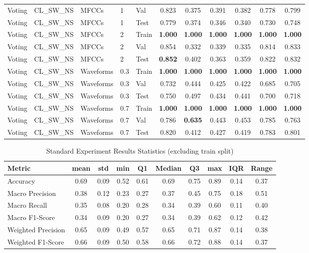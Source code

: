 \begin{landscape}
\begin{longtable}{|l|l|l|l|l|c|c|c|c|c|c|}
Voting & CL\_SW\_NS & MFCCs & 1 & Val & 0.823 & 0.375 & 0.391 & 0.382 & 0.778 & 0.799 \\
Voting & CL\_SW\_NS & MFCCs & 1 & Test & 0.779 & 0.374 & 0.346 & 0.340 & 0.730 & 0.748 \\
Voting & CL\_SW\_NS & MFCCs & 2 & Train & \textbf{1.000} & \textbf{1.000} & \textbf{1.000} & \textbf{1.000} & \textbf{1.000} & \textbf{1.000} \\
Voting & CL\_SW\_NS & MFCCs & 2 & Val & 0.854 & 0.332 & 0.339 & 0.335 & 0.814 & 0.833 \\
Voting & CL\_SW\_NS & MFCCs & 2 & Test & \textbf{0.852} & 0.402 & 0.363 & 0.359 & 0.822 & 0.832 \\
Voting & CL\_SW\_NS & Waveforms & 0.3 & Train & \textbf{1.000} & \textbf{1.000} & \textbf{1.000} & \textbf{1.000} & \textbf{1.000} & \textbf{1.000} \\
Voting & CL\_SW\_NS & Waveforms & 0.3 & Val & 0.732 & 0.444 & 0.425 & 0.422 & 0.685 & 0.705 \\
Voting & CL\_SW\_NS & Waveforms & 0.3 & Test & 0.750 & 0.497 & 0.434 & 0.441 & 0.700 & 0.718 \\
Voting & CL\_SW\_NS & Waveforms & 0.7 & Train & \textbf{1.000} & \textbf{1.000} & \textbf{1.000} & \textbf{1.000} & \textbf{1.000} & \textbf{1.000} \\
Voting & CL\_SW\_NS & Waveforms & 0.7 & Val & 0.786 & \textbf{0.635} & 0.443 & 0.453 & 0.785 & 0.763 \\
Voting & CL\_SW\_NS & Waveforms & 0.7 & Test & 0.820 & 0.412 & 0.427 & 0.419 & 0.783 & 0.801 \\
\end{longtable}
\end{landscape}

\begin{table}[h]
\caption{Standard Experiment Results Statistics (excluding train split)}
\label{tab:Standard_Results_Statistics}
\begin{tabular}{|l|c|c|c|c|c|c|c|c|c|}
\toprule
Metric & mean & std & min & Q1 & Median & Q3 & max & IQR & Range \\
\midrule
Accuracy & 0.69 & 0.09 & 0.52 & 0.61 & 0.69 & 0.75 & 0.89 & 0.14 & 0.37 \\
Macro Precision & 0.38 & 0.12 & 0.23 & 0.27 & 0.37 & 0.45 & 0.75 & 0.18 & 0.51 \\
Macro Recall & 0.35 & 0.08 & 0.20 & 0.28 & 0.34 & 0.39 & 0.60 & 0.11 & 0.40 \\
Macro F1-Score & 0.34 & 0.09 & 0.20 & 0.27 & 0.34 & 0.39 & 0.62 & 0.12 & 0.42 \\
Weighted Precision & 0.65 & 0.09 & 0.49 & 0.57 & 0.65 & 0.71 & 0.87 & 0.14 & 0.38 \\
Weighted F1-Score & 0.66 & 0.09 & 0.50 & 0.58 & 0.66 & 0.72 & 0.88 & 0.14 & 0.37 \\
\bottomrule
\end{tabular}
\end{table}